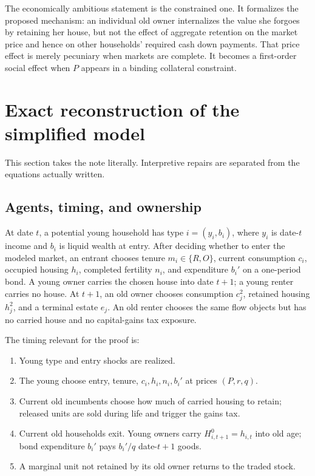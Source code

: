 \documentclass[11pt]{article}
\newcommand{\1}{\mathbf 1}
\begin{document}
The economically ambitious statement is the constrained one. It formalizes
the proposed mechanism: an individual old owner internalizes the value she
forgoes by retaining her house, but not the effect of aggregate retention on
the market price and hence on other households' required cash down payments.
That price effect is merely pecuniary when markets are complete. It becomes a
first-order social effect when $P$ appears in a binding collateral constraint.

\section{Exact reconstruction of the simplified model}
\label{sec:reconstruction}

This section takes the note literally. Interpretive repairs are separated from
the equations actually written.

\subsection{Agents, timing, and ownership}

At date $t$, a potential young household has type $i=(y_i,b_i)$, where $y_i$
is date-$t$ income and $b_i$ is liquid wealth at entry. After deciding whether
to enter the modeled market, an entrant chooses tenure $m_i\in\{R,O\}$,
current consumption $c_i$, occupied housing $h_i$, completed fertility $n_i$,
and expenditure $b_i'$ on a one-period bond. A young owner carries the chosen
house into date $t+1$; a young renter carries no house. At $t+1$, an old owner
chooses consumption $c_j^2$, retained housing $h_j^2$, and a terminal estate
$e_j$. An old renter chooses the same flow objects but has no carried house and
no capital-gains tax exposure.

The timing relevant for the proof is:
\begin{enumerate}
\item Young type and entry shocks are realized.
\item The young choose entry, tenure, $c_i,h_i,n_i,b_i'$ at prices $(P,r,q)$.
\item Current old incumbents choose how much of carried housing to retain;
      released units are sold during life and trigger the gains tax.
\item Current old households exit. Young owners carry $H_{i,t+1}^0=h_{i,t}$
      into old age; bond expenditure $b_i'$ pays $b_i'/q$ date-$t+1$ goods.
\item A marginal unit not retained by its old owner returns to the traded stock.
\end{enumerate}
\end{document}
